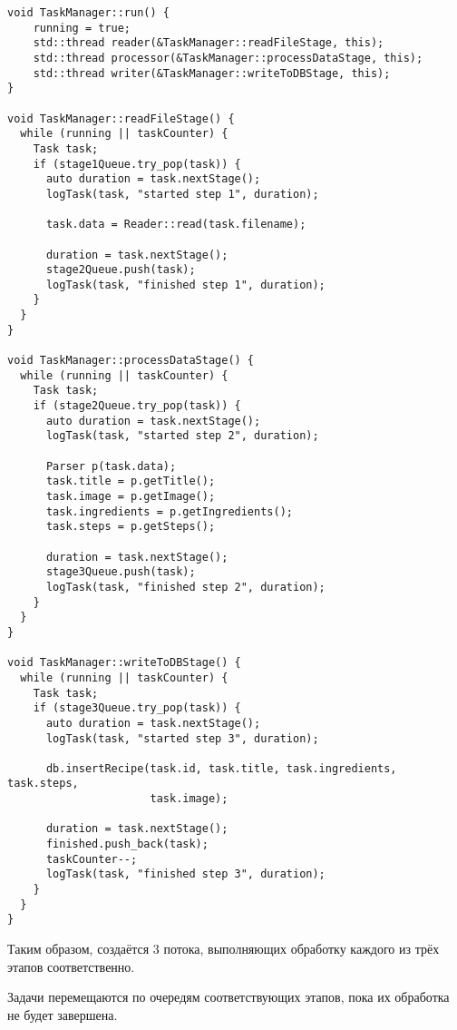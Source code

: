 \begin{lstlisting}[caption={Реализация функции run и функций каждого этапа обработки},label={lst:taskmgrrun}]
void TaskManager::run() {
    running = true;
    std::thread reader(&TaskManager::readFileStage, this);
    std::thread processor(&TaskManager::processDataStage, this);
    std::thread writer(&TaskManager::writeToDBStage, this);
}

void TaskManager::readFileStage() {
  while (running || taskCounter) {
    Task task;
    if (stage1Queue.try_pop(task)) {
      auto duration = task.nextStage();
      logTask(task, "started step 1", duration);

      task.data = Reader::read(task.filename);

      duration = task.nextStage();
      stage2Queue.push(task);
      logTask(task, "finished step 1", duration);
    }
  }
}

void TaskManager::processDataStage() {
  while (running || taskCounter) {
    Task task;
    if (stage2Queue.try_pop(task)) {
      auto duration = task.nextStage();
      logTask(task, "started step 2", duration);

      Parser p(task.data);
      task.title = p.getTitle();
      task.image = p.getImage();
      task.ingredients = p.getIngredients();
      task.steps = p.getSteps();

      duration = task.nextStage();
      stage3Queue.push(task);
      logTask(task, "finished step 2", duration);
    }
  }
}

void TaskManager::writeToDBStage() {
  while (running || taskCounter) {
    Task task;
    if (stage3Queue.try_pop(task)) {
      auto duration = task.nextStage();
      logTask(task, "started step 3", duration);

      db.insertRecipe(task.id, task.title, task.ingredients, task.steps,
                      task.image);

      duration = task.nextStage();
      finished.push_back(task);
      taskCounter--;
      logTask(task, "finished step 3", duration);
    }
  }
}

\end{lstlisting}

Таким образом, создаётся 3 потока, выполняющих обработку каждого из трёх этапов соответственно.

Задачи перемещаются по очередям соответствующих этапов, пока их обработка не будет завершена.
